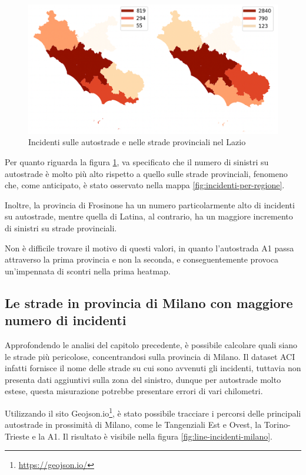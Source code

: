 \documentclass[a4paper,12pt]{report}
\begin{document}
\begin{figure}
    \includegraphics[width=\linewidth]{img_unite/lazio_autostrade_provinciali.png}
    \caption{Incidenti sulle autostrade e nelle strade provinciali nel Lazio}
    \label{fig:lazio-strade}
\end{figure}

Per quanto riguarda la figura \ref{fig:lazio-strade}, va 
specificato che il numero di sinistri su autostrade è molto più alto rispetto 
a quello sulle strade provinciali, fenomeno che, come anticipato, è stato osservato 
nella mappa \ref{fig:incidenti-per-regione}. 

Inoltre, la provincia di Frosinone ha un numero particolarmente alto di incidenti su 
autostrade, mentre quella di Latina, al contrario, ha un maggiore incremento di 
sinistri su strade provinciali. 

Non è difficile trovare il motivo di questi valori, in quanto l'autostrada A1 passa 
attraverso la prima provincia e non la seconda, e conseguentemente provoca 
un'impennata di scontri nella prima heatmap. 

\subsection{Le strade in provincia di Milano con maggiore numero di incidenti}

Approfondendo le analisi del capitolo precedente, è possibile calcolare quali siano 
le strade più pericolose, concentrandosi sulla provincia di Milano. 
Il dataset ACI infatti fornisce il nome delle strade su cui sono avvenuti gli incidenti, 
tuttavia non presenta dati aggiuntivi sulla zona del sinistro, dunque per autostrade molto 
estese, questa misurazione potrebbe presentare errori di vari chilometri. 

Utilizzando il sito Geojson.io\footnote{\url{https://geojson.io/}}, 
è stato possibile tracciare i percorsi delle principali autostrade in prossimità di 
Milano, come le Tangenziali Est e Ovest, la Torino-Trieste e la A1. 
Il risultato è visibile nella figura \ref{fig:line-incidenti-milano}. 
\end{document}
